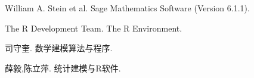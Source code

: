 \documentclass{article}
\begin{document}
\begin{CJK*}{UTF8}{gbsn}
\begin{thebibliography}{99}
 William A. Stein et al.
\newblock Sage Mathematics Software (Version 6.1.1).

 The R Development Team.
\newblock The R Environment.

 司守奎.
\newblock 数学建模算法与程序.

 薛毅,陈立萍.
\newblock 统计建模与R软件.

\end{thebibliography}

\end{CJK*}
\end{document}
